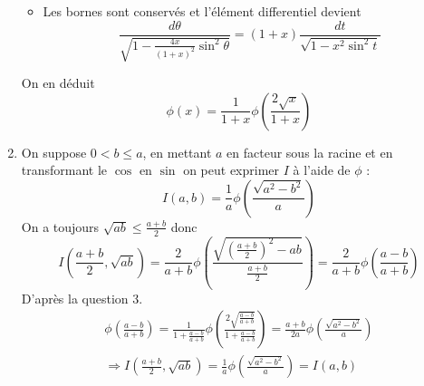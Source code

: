 \begin{enumerate}
\begin{itemize}
\item  Les bornes sont conserv\'{e}s et l'\'{e}l\'{e}ment differentiel devient
\[
\frac{d\theta }{\sqrt{1-\frac{4x}{(1+x)^{2}}\sin ^{2}\theta }}=(1+x)\frac{dt}{\sqrt{1-x^{2}\sin ^{2}t}}
\]
\end{itemize}
On en d\'{e}duit 
\begin{displaymath}
\phi (x)=\frac{1}{1+x}\phi (\frac{2\sqrt{x}}{1+x}) 
\end{displaymath}

\item  On suppose $0<b\leq a$, en mettant $a$ en facteur sous la racine et
en transformant le $\cos $ en $\sin $ on peut exprimer $I$ \`{a} l'aide de $%
\phi $ : 
\[
I(a,b)=\frac{1}{a}\phi (\frac{\sqrt{a^{2}-b^{2}}}{a})
\]
On a toujours $\sqrt{ab}\leq \frac{a+b}{2}$ donc 
\[
I(\frac{a+b}{2},\sqrt{ab})=\frac{2}{a+b}\phi (\frac{\sqrt{\left( \frac{a+b}{2%
}\right) ^{2}-ab}}{\frac{a+b}{2}})=\frac{2}{a+b}\phi (\frac{a-b}{a+b})
\]
D'apr\`{e}s la question 3.
\begin{multline*}
\phi (\frac{a-b}{a+b})
=\frac{1}{1+\frac{a-b}{a+b}}\phi (\frac{2\sqrt{\frac{a-b}{a+b}}}{1+\frac{a-b}{a+b}})
=\frac{a+b}{2a}\phi (\frac{\sqrt{a^{2}-b^{2}}}{a}) \\
\Rightarrow
 I(\frac{a+b}{2},\sqrt{ab}) = \frac{1}{a}\phi (\frac{\sqrt{a^{2}-b^{2}}}{a}) = I(a,b) 
\end{multline*}
\end{enumerate}

